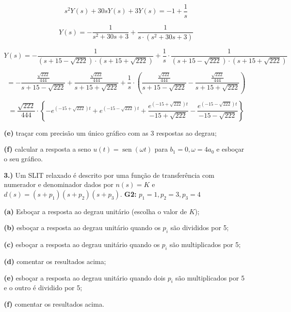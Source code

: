 \documentclass{article}
\DeclareMathOperator{\sen}{sen}
\begin{document}
\[ s^{2}Y(s) + 30sY(s) + 3Y(s) = - 1 + \frac{1}{s} \]

\[ Y(s) = - \frac{1}{s^{2} + 30s + 3} + \frac{1}{s \cdot (s^{2} + 30s + 3)}\]

\[ Y(s) = - \frac{1}{(s + 15 - \sqrt{222}) \cdot (s + 15 + \sqrt{222})} + \frac{1}{s} \cdot \frac{1}{(s + 15 - \sqrt{222}) \cdot (s + 15 + \sqrt{222})}\]

\[  = - \frac{ \frac{\sqrt{222}}{444}}{s + 15 - \sqrt{222}} + \frac{\frac{\sqrt{222}}{444}}{s + 15 + \sqrt{222}} + \frac{1}{s} \cdot \left(\frac{ \frac{\sqrt{222}}{444}}{s + 15 - \sqrt{222}} - \frac{\frac{\sqrt{222}}{444}}{s + 15 + \sqrt{222}}\right) \]

\[ = \frac{\sqrt{222}}{444} \cdot \left\{ - e^{(-15+\sqrt{222})t} + e^{(-15-\sqrt{222})t} + \frac{e^{(-15+\sqrt{222})t}}{-15+\sqrt{222}} - \frac{e^{(-15-\sqrt{222})t}}{-15-\sqrt{222}} \right\} \]

\vspace{\baselineskip}

\textbf{(e)} traçar com precisão um único gráfico com as 3 respostas ao degrau;

\textbf{(f)} calcular a resposta a seno $u(t) = \sen(\omega t)$ para $b_1 = 0, \omega = 4a_0$ e esboçar o seu gráfico.


\vspace{\baselineskip}

\textbf{3.)} Um SLIT relaxado é descrito por uma função de transferência com numerador e denominador dados por $n(s) = K$ e $d(s) = (s + p_1)(s + p_2)(s + p_3)$.
\textbf{G2:} $p_1 = 1, p_2 = 3, p_3 = 4$

\textbf{(a)} Esboçar a resposta ao degrau unitário (escolha o valor de $K$);

\textbf{(b)} esboçar a resposta ao degrau unitário quando os $p_i$ são divididos por 5;

\textbf{(c)} esboçar a resposta ao degrau unitário quando os $p_i$ são multiplicados por 5;

\textbf{(d)} comentar os resultados acima;

\textbf{(e)} esboçar a resposta ao degrau unitário quando dois $p_i$ são multiplicados por 5 e o outro é dividido por 5;

\textbf{(f)} comentar os resultados acima.
\end{document}

